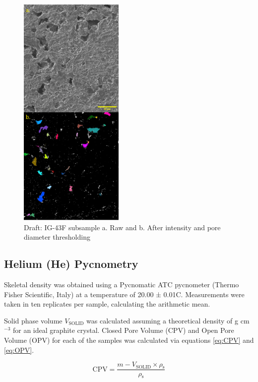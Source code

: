 \documentclass[3p,twocolumn]{elsarticle}
\begin{document}
\begin{figure}[!htbp]
    \centering
    \includegraphics[width=0.45\textwidth]{./Media/C1-ig430f fused cropped 8 bit one color threshed subsample 2um areathresh}
    \caption{Draft: IG-43F subsample a. Raw and b. After intensity and pore diameter thresholding}
    \label{fig:C1-ig430f fused cropped 8 bit one color threshed subsample 2um areathresh}
\end{figure}

\subsection{Helium (He) Pycnometry}
	
Skeletal density was obtained using a Pycnomatic ATC pycnometer (Thermo Fisher
Scientific, Italy) at a temperature of 20.00 ± 0.01\textdegree{}C. Measurements
were taken in ten replicates per sample, calculating the arithmetic mean.

Solid phase volume $V_{\mathrm{SOLID}}$ was calculated assuming a theoretical
density of  g cm$^{-3}$ for an ideal
graphite crystal. Closed Pore Volume (CPV) and Open Pore Volume (OPV) for each
of the samples was calculated via equations \ref{eq:CPV} and \ref{eq:OPV}.

\begin{equation}
\mathrm{CPV} = \frac{m - V_{\mathrm{SOLID}} \times \rho{_\mathrm{s}}}{\rho{_\mathrm{s}}} 	\label{eq:CPV} 
\end{equation}
\end{document}
